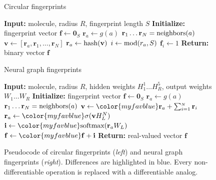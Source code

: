 \documentclass{article}
\newcommand{\vv}{\mathbf{v}}
\newcommand{\vf}{\mathbf{f}}
\newcommand{\vi}{\mathbf{i}}
\newcommand{\vr}{\mathbf{r}}
\newcommand{\vzero}{\mathbf{0}}
\begin{document}
\algrenewcommand\algorithmicindent{1.3em}%
\begin{figure}[t]
 \begin{minipage}[t]{0.49\columnwidth}
 \begin{algorithm}[H]
\caption{Circular fingerprints} 
\label{alg:ecfp} 
\begin{algorithmic}[1]
\State \textbf{Input:} {molecule, radius $R$, fingerprint length $S$}
\State \textbf{Initialize:} {fingerprint vector $\vf \leftarrow \vzero_S$}
    \State $\vr_a \leftarrow g(a)$ 
\EndFor
{} 
		\State $\vr_{1} \dots \vr_{N} = \textnormal{neighbors}(a)$
		\State $\vv \leftarrow [\vr_a, \vr_{1}, \dots, \vr_{N}]$ 
		\State $\vr_a \leftarrow \textnormal{hash}(\vv)$ 
		\State $i \leftarrow \textnormal{mod}(r_a, S)$ 		
		\State $\vf_{i} \leftarrow 1$ 
	\EndFor
\EndFor
\State \textbf{Return:} {binary vector $\vf$}
\end{algorithmic}
\end{algorithm}
\end{minipage}
\hfill
\begin{minipage}[t]{0.49\columnwidth}
\begin{algorithm}[H]
\caption{Neural graph fingerprints} 
\label{alg:neural} 
\begin{algorithmic}[1]
\State \textbf{Input:} {molecule, radius $R$, {\color{myfavblue} hidden weights $H_1^1 \dots H_R^5$, output weights $W_1 \dots W_R$}}
\State \textbf{Initialize:} {fingerprint vector $\vf \leftarrow \vzero_S$}
	\State $\vr_a \leftarrow g(a)$ 
\EndFor
{} 
		\State $\vr_{1} \dots \vr_{N} = \textnormal{neighbors}(a)$
		\State $\vv \leftarrow {\color{myfavblue} \vr_a + \sum_{i=1}^{_{N}} \vr_{i}}$ 
		\State $\vr_a \leftarrow {\color{myfavblue} \sigma(\vv H_L^N)}$ 
		\State $\vi \leftarrow {\color{myfavblue} \textnormal{softmax}(\vr_a W_L)}$ 
		\State $\vf \leftarrow {\color{myfavblue} \vf + \vi}$ 
    \EndFor
\EndFor
\State \textbf{Return:} { {\color{myfavblue} real-valued} vector $\vf$}
\end{algorithmic}
\end{algorithm}
\end{minipage}
\hfill
\caption{Pseudocode of circular fingerprints (\emph{left}) and neural graph fingerprints (\emph{right}).
Differences are highlighted in blue.
Every non-differentiable operation is replaced with a differentiable analog.}
\end{figure}
\end{document}
